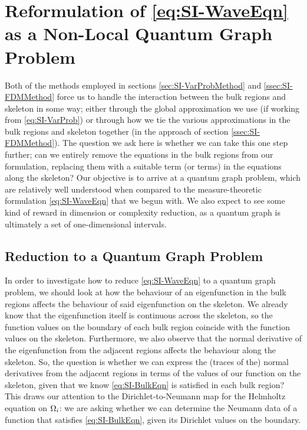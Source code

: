 \section{Reformulation of \eqref{eq:SI-WaveEqn} as a Non-Local Quantum Graph Problem} \label{sec:SI-NonLocalQG}
Both of the methods employed in sections \ref{sec:SI-VarProbMethod} and \ref{ssec:SI-FDMMethod} force us to handle the interaction between the bulk regions and skeleton in some way; either through the global approximation we use (if working from \eqref{eq:SI-VarProb}) or through how we tie the various approximations in the bulk regions and skeleton together (in the approach of section \ref{ssec:SI-FDMMethod}).
The question we ask here is whether we can take this one step further; can we entirely remove the equations in the bulk regions from our formulation, replacing them with a suitable term (or terms) in the equations along the skeleton?
Our objective is to arrive at a quantum graph problem, which are relatively well understood when compared to the measure-theoretic formulation \eqref{eq:SI-WaveEqn} that we begun with.
We also expect to see some kind of reward in dimension or complexity reduction, as a quantum graph is ultimately a set of one-dimensional intervals.

\subsection{Reduction to a Quantum Graph Problem} \label{ssec:SI-ToQG}
In order to investigate how to reduce \eqref{eq:SI-WaveEqn} to a quantum graph problem, we should look at how the behaviour of an eigenfunction in the bulk regions affects the behaviour of said eigenfunction on the skeleton.
We already know that the eigenfunction itself is continuous across the skeleton, so the function values on the boundary of each bulk region coincide with the function values on the skeleton.
Furthermore, we also observe that the normal derivative of the eigenfunction from the adjacent regions affects the behaviour along the skeleton.
So, the question is whether we can express the (traces of the) normal derivatives from the adjacent regions in terms of the values of our function on the skeleton, given that we know \eqref{eq:SI-BulkEqn} is satisfied in each bulk region?
This draws our attention to the Dirichlet-to-Neumann map for the Helmholtz equation on $\Omega_i$: we are asking whether we can determine the Neumann data of a function that satisfies \eqref{eq:SI-BulkEqn}, given its Dirichlet values on the boundary.

